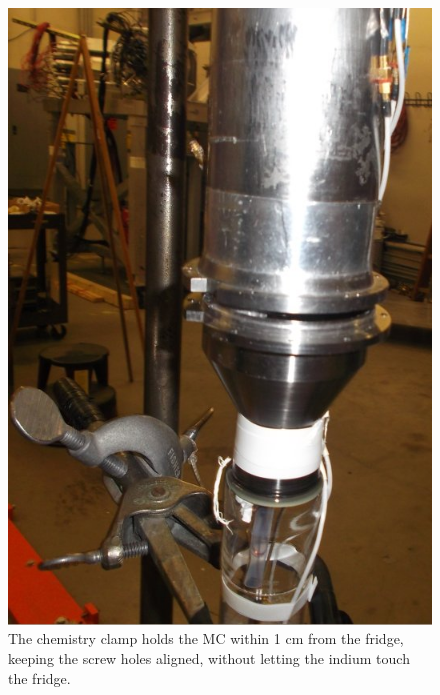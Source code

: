 \begin{figure}[htbp!]
 \centering
 \begin{minipage}{0.45\textwidth}
 \includegraphics[width=\textwidth]{./img/indium-seal-mc-chemistry-clamp.jpg}
 \caption{The chemistry clamp holds the MC within 1 cm from the fridge, keeping the screw holes aligned, without letting the indium touch the fridge.}
 \label{fig:indium-seal-mc-chemistry-clamp}
 \end{minipage}
 \quad
  \begin{minipage}{0.45\textwidth}

\end{minipage}
\end{figure}
